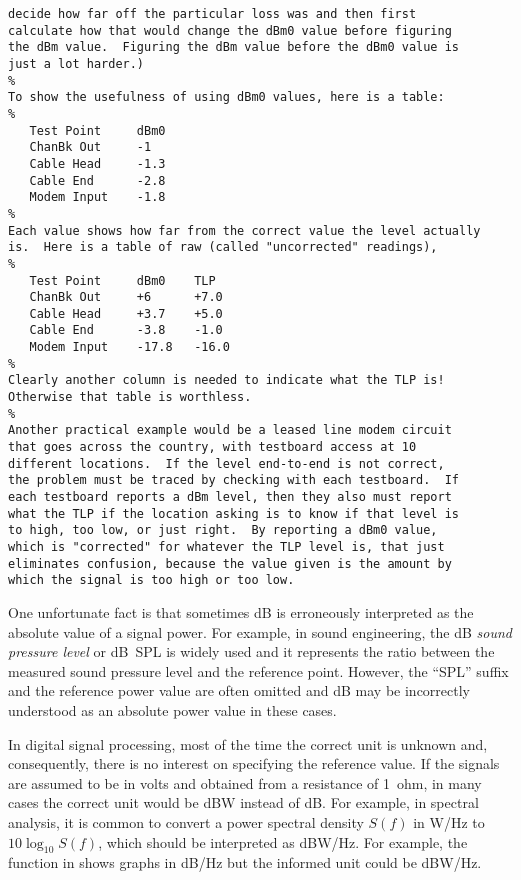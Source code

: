 {\begin{verbatim}
decide how far off the particular loss was and then first
calculate how that would change the dBm0 value before figuring
the dBm value.  Figuring the dBm value before the dBm0 value is
just a lot harder.)
%
To show the usefulness of using dBm0 values, here is a table:
%
   Test Point     dBm0
   ChanBk Out     -1
   Cable Head     -1.3
   Cable End      -2.8
   Modem Input    -1.8
%
Each value shows how far from the correct value the level actually
is.  Here is a table of raw (called "uncorrected" readings),
%
   Test Point     dBm0    TLP
   ChanBk Out     +6      +7.0
   Cable Head     +3.7    +5.0
   Cable End      -3.8    -1.0
   Modem Input    -17.8   -16.0
%
Clearly another column is needed to indicate what the TLP is!
Otherwise that table is worthless.
%
Another practical example would be a leased line modem circuit
that goes across the country, with testboard access at 10
different locations.  If the level end-to-end is not correct,
the problem must be traced by checking with each testboard.  If
each testboard reports a dBm level, then they also must report
what the TLP if the location asking is to know if that level is
to high, too low, or just right.  By reporting a dBm0 value,
which is "corrected" for whatever the TLP level is, that just
eliminates confusion, because the value given is the amount by
which the signal is too high or too low.
\end{verbatim}
}

One unfortunate fact is that sometimes dB is erroneously interpreted as the absolute value of a signal power. For example, in sound engineering, the dB \emph{sound pressure level} or dB~SPL is widely used and it represents the ratio between the measured sound pressure level and the reference point. However,  the ``SPL'' suffix and the reference power value
are often omitted and dB may be incorrectly understood as an absolute power value in these cases.

In digital signal processing, most of the time the correct unit is unknown and, consequently,
there is no interest on specifying the reference value. If the signals are assumed to be
in volts and obtained from a resistance of 1~ohm, in many cases the correct unit would be dBW instead of dB. For example, in spectral analysis, it is common to convert a power spectral density $S(f)$
in W/Hz to $10 \log_{10} S(f)$, which should be interpreted as dBW/Hz. 
For example, the  function in {\matlab} shows graphs in dB/Hz 
but the informed unit could be dBW/Hz.

